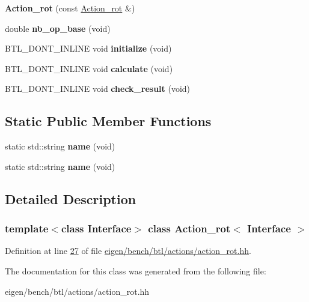 \begin{DoxyCompactItemize}
{\bfseries Action\+\_\+rot} (const \hyperlink{class_action__rot}{Action\+\_\+rot} \&)
\item 
\mbox{\label{class_action__rot_a17f86cf6ad09fdc2701e4ca215fcc27d}} 
double {\bfseries nb\+\_\+op\+\_\+base} (void)
\item 
\mbox{\label{class_action__rot_a51d899481ebaafc5c2c3ad923e5e6695}} 
B\+T\+L\+\_\+\+D\+O\+N\+T\+\_\+\+I\+N\+L\+I\+NE void {\bfseries initialize} (void)
\item 
\mbox{\label{class_action__rot_a130ab382c7d1650a0e89323ed439eb50}} 
B\+T\+L\+\_\+\+D\+O\+N\+T\+\_\+\+I\+N\+L\+I\+NE void {\bfseries calculate} (void)
\item 
\mbox{\label{class_action__rot_a8a80274cba6628f68146e5eae0544c54}} 
B\+T\+L\+\_\+\+D\+O\+N\+T\+\_\+\+I\+N\+L\+I\+NE void {\bfseries check\+\_\+result} (void)
\end{DoxyCompactItemize}
\subsection*{Static Public Member Functions}
\begin{DoxyCompactItemize}
\item 
\mbox{\label{class_action__rot_a44c12f2843a2c3cdd2bd89115a7dcfe8}} 
static std\+::string {\bfseries name} (void)
\item 
\mbox{\label{class_action__rot_a44c12f2843a2c3cdd2bd89115a7dcfe8}} 
static std\+::string {\bfseries name} (void)
\end{DoxyCompactItemize}


\subsection{Detailed Description}
\subsubsection*{template$<$class Interface$>$\newline
class Action\+\_\+rot$<$ Interface $>$}



Definition at line \hyperlink{eigen_2bench_2btl_2actions_2action__rot_8hh_source_l00027}{27} of file \hyperlink{eigen_2bench_2btl_2actions_2action__rot_8hh_source}{eigen/bench/btl/actions/action\+\_\+rot.\+hh}.



The documentation for this class was generated from the following file\+:\begin{DoxyCompactItemize}
\item 
eigen/bench/btl/actions/action\+\_\+rot.\+hh\end{DoxyCompactItemize}
